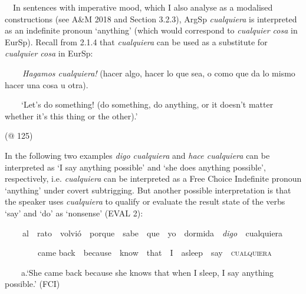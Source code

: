 \begin{styleStandard}
\ \ In sentences with imperative mood, which I also analyse as a modalised constructions (see A\&M 2018 and Section 3.2.3), ArgSp \textit{cualquiera} is interpreted as an indefinite pronoun ‘anything’ (which would correspond to \textit{cualquier cosa }in EurSp). Recall from 2.1.4 that \textit{cualquiera} can be used as a substitute for \textit{cualquier cosa} in EurSp:
\end{styleStandard}

\begin{styleStandard}
\textbf{\ \ }\ \ \textit{Hagamos cualquiera! }(hacer algo, hacer lo que sea, o como que da lo mismo hacer una cosa u otra).
\end{styleStandard}

\begin{styleStandard}
\ \ \ \ ‘Let’s do something! (do something, do anything, or it doesn’t matter whether it’s this thing or the other).’
\end{styleStandard}

\begin{styleStandard}
(@ 125) 
\end{styleStandard}

\begin{styleStandard}
In the following two examples \textit{digo cualquiera} and \textit{hace cualquiera} can be interpreted as ‘I say anything possible’ and ‘she does anything possible’, respectively, i.e. \textit{cualquiera} can be interpreted as a Free Choice Indefinite pronoun ‘anything’ under covert subtrigging. But another possible interpretation is that the speaker uses \textit{cualquiera} to qualify or evaluate the result state of the verbs ‘say’ and ‘do’ as ‘nonsense’ (EVAL 2):
\end{styleStandard}

\begin{styleStandard}
\textbf{\ \ }\ \ al\ \ rato\ \ volvió\ \ porque\ \ sabe\ \ que\ \ yo\ \ dormida\ \ \textit{digo\ \ }cualquiera
\end{styleStandard}

\begin{styleStandard}
\ \ \ \ \ \ \ \ came back\ \ because\ \ know\ \ that\ \ I\ \ asleep\ \ say\ \ \textsc{cualquiera}
\end{styleStandard}

\begin{styleStandard}
\ \ \ \ a.‘She came back because she knows that when I sleep, I say anything possible.’ (FCI)
\end{styleStandard}

